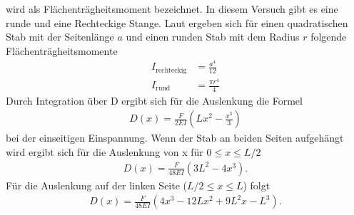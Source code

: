 wird als Flächenträgheitsmoment bezeichnet.
In diesem Versuch gibt es eine runde und eine Rechteckige Stange.
Laut \cite{uni_siegen} ergeben sich für einen quadratischen Stab mit der Seitenlänge $a$ und einen runden Stab mit dem Radius $r$ folgende Flächenträgheitsmomente
\begin{align}
    I_\text{rechteckig} &= \frac{a^4}{12}  \label{eq:Flachentragheitsmomente}\\
    I_\text{rund} &= \frac{\pi r^4}{4}
    \label{eq:Flachentragheitsmoment_rund}
\end{align}
%
Durch Integration über D ergibt sich für die Auslenkung die Formel
\begin{align}
    D(x) = \frac{F}{2 E I} \left(L x^2 - \frac{x^3}{3} \right)
    \label{eq:D_x_einseitig}
\end{align}
bei der einseitigen Einspannung.
Wenn der Stab an beiden Seiten aufgehängt wird ergibt sich für die Auslenkung von x für
$0 \leq x \leq L/2$
\begin{align}
    D(x) = \frac{F}{48 E I} \left(3 L^2- 4 x^3\right).
    \label{eq:D_x_rechts}
\end{align}
Für die Auslenkung auf der linken Seite ($L/2 \leq x \leq L $) folgt
\begin{align}
    D(x) = \frac{F}{48 E I} \left(4x^3 - 12L x^2 + 9L^2 x - L^3 \right). 
    \label{eq:D_x_beidseitig_links}
\end{align}
